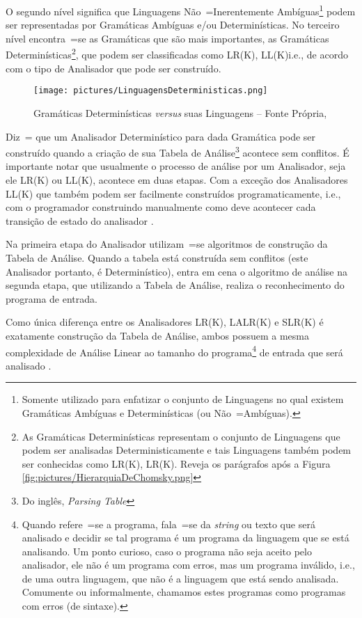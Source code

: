 {    O segundo nível significa que Linguagens Não~=Inerentemente Ambíguas\footnote{
    Somente utilizado para enfatizar o conjunto de Linguagens no qual existem Gramáticas Ambíguas e
    Determinísticas (ou Não~=Ambíguas).
    }
    podem ser representadas por Gramáticas Ambíguas e\slash{}ou Determinísticas.
    No terceiro nível encontra~=se as Gramáticas que são mais importantes,
    as Gramáticas Determinísticas\footnote{
    As Gramáticas Determinísticas representam o conjunto de Linguagens que podem ser analisadas Deterministicamente e
    tais Linguagens também podem ser conhecidas como LR(K),
    LR(K).
    Reveja os parágrafos após a Figura \ref{fig:pictures/HierarquiaDeChomsky.png}
    },
    que podem ser classificadas como LR(K),
    LL(K)i.e.,
    de acordo com o tipo de Analisador que pode ser construído.
    \begin{figure}[h]
    \centering
    \texttt{[image: pictures/LinguagensDeterministicas.png]}
    \caption[Gramáticas Determinísticas \textit{versus} suas Linguagens]{Gramáticas Determinísticas \textit{versus} suas Linguagens -- Fonte Própria,
    }
    \label{fig:pictures/LinguagensDeterministicas.png}
    \end{figure}

    Diz~= que um Analisador Determinístico para dada Gramática pode ser construído quando a criação de sua Tabela de Análise\footnote{
    Do inglês, \textit{Parsing Table}
    }
    \cite{ahoCompilerDragonBook} acontece sem conflitos.
    É importante notar que usualmente o processo de análise por um Analisador,
    seja ele LR(K) ou
    LL(K),
    acontece em duas etapas.
    Com a exceção dos Analisadores LL(K) que também podem ser facilmente construídos programaticamente,
    i.e.,
    com o programador construindo manualmente como deve acontecer cada transição de estado do analisador \cite{ahoCompilerDragonBook}.

    Na primeira etapa do Analisador utilizam~=se algoritmos de construção da Tabela de Análise.
    Quando a tabela está construída sem conflitos (este Analisador portanto,
    é Determinístico),
    entra em cena o algoritmo de análise na segunda etapa,
    que utilizando a Tabela de Análise,
    realiza o reconhecimento do programa de entrada.

    Como única diferença entre os Analisadores LR(K),
    LALR(K) e
    SLR(K) é exatamente construção da Tabela de Análise,
    ambos possuem a mesma complexidade de Análise Linear \cite{knuthLrParser1965} ao tamanho do programa\footnote{
    Quando refere~=se a programa,
    fala~=se da \textit{string} ou
    texto que será analisado e
    decidir se tal programa é um programa da linguagem que se está analisando.
    Um ponto curioso,
    caso o programa não seja aceito pelo analisador,
    ele não é um programa com erros,
    mas um programa inválido,
    i.e.,
    de uma outra linguagem,
    que não é a linguagem que está sendo analisada.
    Comumente ou
    informalmente,
    chamamos estes programas como programas com erros (de sintaxe).
    }
    de entrada que será analisado \cite{linearLL1AndLR1Grammars,generalContextFreeParsingAlgorithm}.

}
